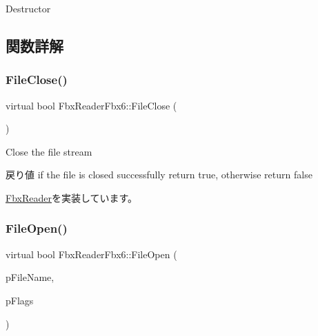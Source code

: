 Destructor 

\subsection{関数詳解}
\mbox{\label{class_fbx_reader_fbx6_a05230d40a8c8c2f62afee63f70a8d3be}} 
\subsubsection{\texorpdfstring{File\+Close()}{FileClose()}}
{\footnotesize\ttfamily virtual bool Fbx\+Reader\+Fbx6\+::\+File\+Close (\begin{DoxyParamCaption}{ }\end{DoxyParamCaption})\hspace{0.3cm}{\ttfamily [virtual]}}

Close the file stream \begin{DoxyReturn}{戻り値}
if the file is closed successfully return {\ttfamily true}, otherwise return {\ttfamily false} 
\end{DoxyReturn}


\hyperlink{class_fbx_reader_a327df94e5c24315fc5cbcedf0e7bb615}{Fbx\+Reader}を実装しています。

\mbox{\label{class_fbx_reader_fbx6_a9a28e37abe39c65e899a9c6f0b705756}} 
\subsubsection{\texorpdfstring{File\+Open()}{FileOpen()}\hspace{0.1cm}{\footnotesize\ttfamily [1/4]}}
{\footnotesize\ttfamily virtual bool Fbx\+Reader\+Fbx6\+::\+File\+Open (\begin{DoxyParamCaption}\item[{char $\ast$}]{p\+File\+Name,  }\item[{\hyperlink{class_fbx_reader_a1a14bd907bcda7dd48ba9b0a6236b7b8}{E\+File\+Open\+Special\+Flags}}]{p\+Flags }\end{DoxyParamCaption})\hspace{0.3cm}{\ttfamily [virtual]}}

